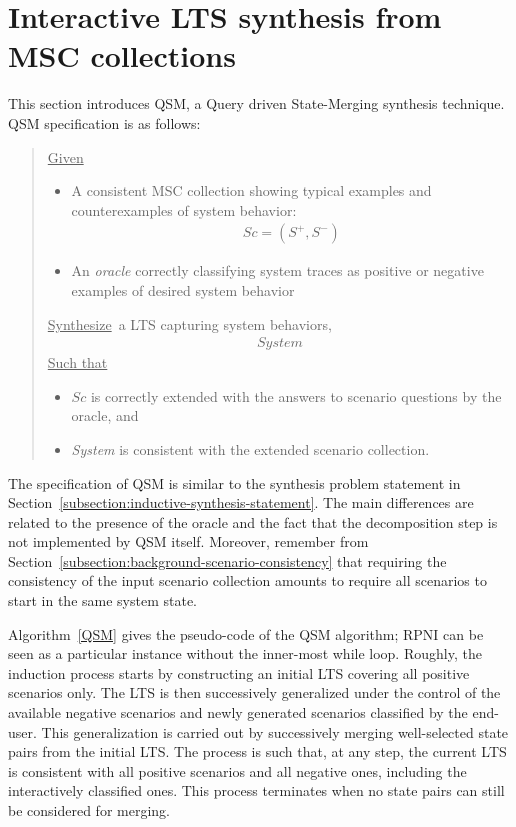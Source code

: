 \section{Interactive LTS synthesis from MSC collections\label{section:lts-induction-from-mscs}}

This section introduces QSM, a Query driven State-Merging synthesis technique. QSM specification is as follows:

\begin{quote}
\underline{Given}
\begin{itemize}
\item A consistent MSC collection showing typical examples and counterexamples of system behavior:
\begin{align*}Sc = (S^+,S^-)\end{align*}
\item An \emph{oracle} correctly classifying system traces as positive or negative examples of desired system behavior
\end{itemize}
\underline{Synthesize}~a LTS capturing system behaviors,
\begin{align*}System\end{align*}
\underline{Such that}
\begin{itemize}
\item $Sc$ is correctly extended with the answers to scenario questions by the oracle, and
\item \emph{System} is consistent with the extended scenario collection.
\end{itemize}
\end{quote}

The specification of QSM is similar to the synthesis problem statement in Section~\ref{subsection:inductive-synthesis-statement}. The main differences are related to the presence of the oracle and the fact that the decomposition step is not implemented by QSM itself. Moreover, remember from Section~\ref{subsection:background-scenario-consistency} that requiring the consistency of the input scenario collection amounts to require all scenarios to start in the same system state.

Algorithm~\ref{QSM} gives the pseudo-code of the \textsc{QSM} algorithm; RPNI can be seen as a particular instance without the inner-most while loop. Roughly, the induction process starts by constructing an initial LTS covering all positive scenarios only. The LTS is then successively generalized under the control of the available negative scenarios and newly generated scenarios classified by the end-user. This generalization is carried out by successively merging well-selected state pairs from the initial LTS. The process is such that, at any step, the current LTS is consistent with all positive scenarios and all negative ones, including the interactively classified ones. This process terminates when no state pairs can still be considered for merging.

